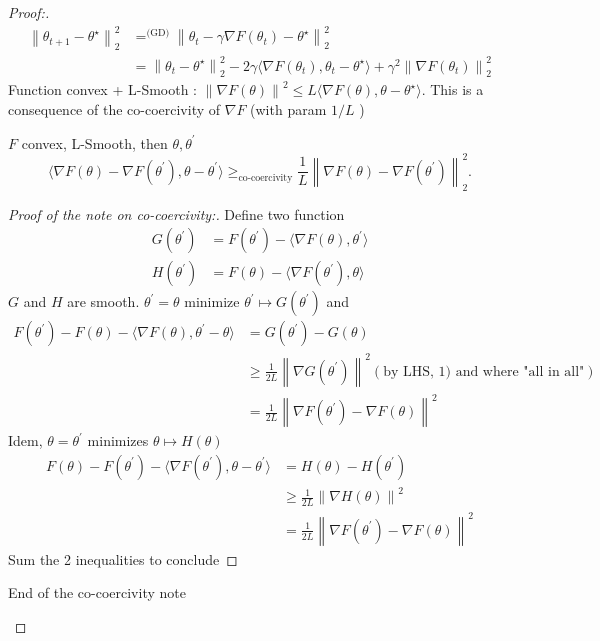 \begin{proof}[Proof:]
    \begin{align*}
        \left\| \theta _{t+1} - \theta ^\star  \right\| ^2 _2  
            &= ^{\text{(GD)}} \left\| \theta _t - \gamma \nabla F(\theta _t) - \theta ^\star  \right\| ^2 _2 \\
            &= \left\| \theta _t - \theta ^\star  \right\| ^2 _2 - 2 \gamma  \langle \nabla F(\theta _t), \theta _t - \theta ^\star \rangle + \gamma ^2 \left\| \nabla F(\theta _t) \right\| ^2 _2
    \end{align*}
    Function convex + L-Smooth : $ \left\| \nabla F(\theta ) \right\| ^2 \leq L \langle \nabla F(\theta ), \theta  - \theta ^\star \rangle $. This is a consequence of the co-coercivity of $ \nabla F $ (with param $ 1/L $ )
    \begin{note}[Co-coercivity]
        $ F $ convex, L-Smooth, then $ \theta , \theta ^\prime  $ 
        \[
            \langle  \nabla F(\theta ) - \nabla F(\theta ^\prime ), \theta  - \theta ^\prime \rangle \geq_{\text{co-coercivity}} \frac{1}{L} \left\| \nabla F(\theta ) - \nabla F(\theta ^\prime ) \right\| ^2 _2
        .\]
        \begin{proof}[Proof of the note on co-coercivity:]
            Define two function \begin{align*}
                G(\theta ^\prime ) &= F(\theta ^\prime ) - \langle \nabla F(\theta ) , \theta ^\prime \rangle  \\
                H(\theta ^\prime ) &= F(\theta ) - \langle \nabla F(\theta ^\prime ), \theta \rangle 
            \end{align*}
            $ G $ and $ H $ are smooth. $ \theta ^\prime = \theta  $ minimize $ \theta ^\prime  \mapsto G(\theta ^\prime ) $ and 
            \begin{align*}
                F(\theta ^\prime) - F(\theta ) - \langle \nabla F(\theta ) , \theta ^\prime - \theta  \rangle
                    &= G(\theta ^\prime) - G(\theta ) \\
                    &\geq \frac{1}{2L} \left\| \nabla G(\theta ^\prime ) \right\| ^2 (\text{by LHS, 1) and where "all in all"} ) \\
                    &= \frac{1}{2L} \left\| \nabla F(\theta ^\prime ) - \nabla F(\theta ) \right\| ^2
            \end{align*} 
            Idem, $ \theta  = \theta ^\prime  $ minimizes $ \theta \mapsto H(\theta ) $ 
            \begin{align*}
                F(\theta ) - F(\theta ^\prime ) - \langle \nabla F(\theta ^\prime ), \theta  - \theta ^\prime \rangle &= H (\theta ) - H(\theta ^\prime ) \\
                &\geq \frac{1}{2L} \left\| \nabla H(\theta )  \right\| ^2 \\
                &= \frac{1}{2L} \left\| \nabla F(\theta ^\prime ) - \nabla F(\theta ) \right\| ^2
            \end{align*}
            Sum the 2 inequalities to conclude
        \end{proof}
        End of the co-coercivity note
    \end{note}
    

\end{proof}
